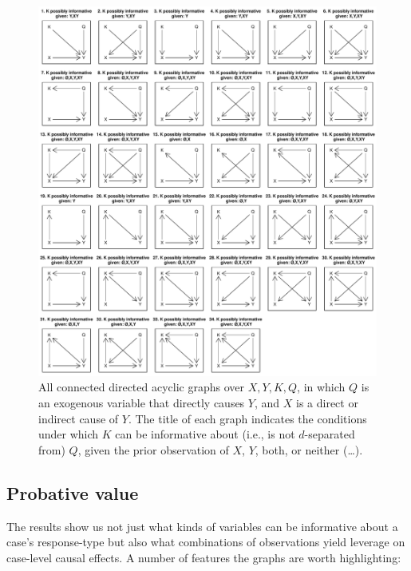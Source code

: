 \documentclass[
  12pt,
]{book}
\begin{document}
\begin{figure}
\centering
\includegraphics{ii_files/figure-latex/34graphs-1.pdf}
\caption{\label{fig:34graphs}\label{fig:34graphs} All connected directed acyclic graphs over \(X,Y,K,Q\), in which \(Q\) is an exogenous variable that directly causes \(Y\), and \(X\) is a direct or indirect cause of \(Y\). The title of each graph indicates the conditions under which \(K\) can be informative about (i.e., is not \(d\)-separated from) \(Q\), given the prior observation of \(X\), \(Y\), both, or neither (\ldots).}
\end{figure}

\hypertarget{probative-value}{%
\subsection{Probative value}\label{probative-value}}

The results show us not just what kinds of variables can be informative about a case's response-type but also what combinations of observations yield leverage on case-level causal effects. A number of features the graphs are worth highlighting:
\end{document}
